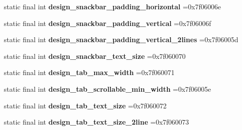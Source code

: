 \begin{DoxyCompactItemize}
\mbox{\label{classproject4_1_1xaria_1_1R_1_1dimen_afe038e4a94a201b8a5161624e795e069}} 
static final int {\bfseries design\+\_\+snackbar\+\_\+padding\+\_\+horizontal} =0x7f06006e
\item 
\mbox{\label{classproject4_1_1xaria_1_1R_1_1dimen_a5f443004cf398d2fc8e5582a61b24c1f}} 
static final int {\bfseries design\+\_\+snackbar\+\_\+padding\+\_\+vertical} =0x7f06006f
\item 
\mbox{\label{classproject4_1_1xaria_1_1R_1_1dimen_a476670a2047b0cd20f0125833a9c6404}} 
static final int {\bfseries design\+\_\+snackbar\+\_\+padding\+\_\+vertical\+\_\+2lines} =0x7f06005d
\item 
\mbox{\label{classproject4_1_1xaria_1_1R_1_1dimen_aaf2e0953029bc7f9607b4040556ad928}} 
static final int {\bfseries design\+\_\+snackbar\+\_\+text\+\_\+size} =0x7f060070
\item 
\mbox{\label{classproject4_1_1xaria_1_1R_1_1dimen_a36afddc2276d71cf834ea059fa18576e}} 
static final int {\bfseries design\+\_\+tab\+\_\+max\+\_\+width} =0x7f060071
\item 
\mbox{\label{classproject4_1_1xaria_1_1R_1_1dimen_aa2ce832174007ec93bdebff05ddca981}} 
static final int {\bfseries design\+\_\+tab\+\_\+scrollable\+\_\+min\+\_\+width} =0x7f06005e
\item 
\mbox{\label{classproject4_1_1xaria_1_1R_1_1dimen_a8360653d48b1bfc3b41e2055a9127dc1}} 
static final int {\bfseries design\+\_\+tab\+\_\+text\+\_\+size} =0x7f060072
\item 
\mbox{\label{classproject4_1_1xaria_1_1R_1_1dimen_a3699a55cdaa7bfe8d34f11df5c1d3d56}} 
static final int {\bfseries design\+\_\+tab\+\_\+text\+\_\+size\+\_\+2line} =0x7f060073
\item 
\mbox{\label{classproject4_1_1xaria_1_1R_1_1dimen_a9424193d725a18d0b0ce4175e94af49d}} 

\end{DoxyCompactItemize}
